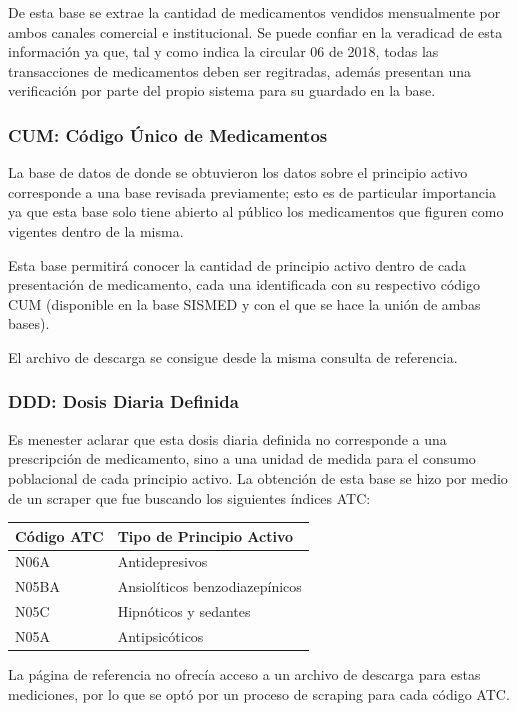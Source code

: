 \documentclass[10pt,twoside,xcolor=table,x11anmes]{IEEEtran}
\begin{document}
De esta base se extrae la cantidad de medicamentos vendidos mensualmente por ambos canales comercial e institucional. Se puede confiar en la veradicad de esta información ya que, tal y como indica la circular 06 de 2018, todas las transacciones de medicamentos deben ser regitradas, además presentan una verificación por parte del propio sistema para su guardado en la base.

\subsubsection{CUM: Código Único de Medicamentos}

La base de datos de donde se obtuvieron los datos sobre el principio activo corresponde a una base revisada previamente; esto es de particular importancia ya que esta base solo tiene abierto al público los medicamentos que figuren como vigentes dentro de la misma.

Esta base permitirá conocer la cantidad de principio activo dentro de cada presentación de medicamento, cada una identificada con su respectivo código CUM (disponible en la base SISMED y con el que se hace la unión de ambas bases). 

El archivo de descarga se consigue desde la misma consulta de referencia.

\subsubsection{DDD: Dosis Diaria Definida}

Es menester aclarar que esta dosis diaria definida no corresponde a una prescripción de medicamento, sino a una unidad de medida para el consumo poblacional de cada principio activo. La obtención de esta base se hizo por medio de un scraper que fue buscando los siguientes índices ATC:

\begin{tabular}{ll}
    \hline
    Código ATC & Tipo de Principio Activo\\
    \hline
    N06A & Antidepresivos\\
    N05BA & Ansiolíticos benzodiazepínicos\\
    N05C &Hipnóticos y sedantes\\
    N05A &Antipsicóticos\\
    \hline
\end{tabular}

La página de referencia no ofrecía acceso a un archivo de descarga para estas mediciones, por lo que se optó por un proceso de scraping para cada código ATC.
\end{document}
